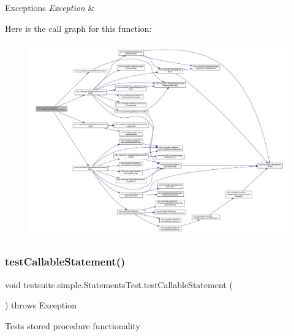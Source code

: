 \begin{DoxyExceptions}{Exceptions}
{\em Exception} & \\
\hline
\end{DoxyExceptions}
Here is the call graph for this function\+:
\nopagebreak
\begin{figure}[H]
\begin{center}
\leavevmode
\includegraphics[width=350pt]{classtestsuite_1_1simple_1_1_statements_test_a8686a9137f5901a701020342f04dc3a7_cgraph}
\end{center}
\end{figure}
\mbox{\label{classtestsuite_1_1simple_1_1_statements_test_a575857630ae7ba0e8a97025a9d5d772f}} 
\subsubsection{\texorpdfstring{test\+Callable\+Statement()}{testCallableStatement()}}
{\footnotesize\ttfamily void testsuite.\+simple.\+Statements\+Test.\+test\+Callable\+Statement (\begin{DoxyParamCaption}{ }\end{DoxyParamCaption}) throws Exception}

Tests stored procedure functionality


